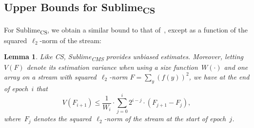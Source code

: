 \documentclass[sigconf]{acmart}
\newtheorem{lemma}[theorem]{Lemma}
\newcommand{\sketch}{Sublime}
\newcommand{\sketchcms}{\sketch\textsubscript{CMS}\xspace}
\newcommand{\sketchcs}{\sketch\textsubscript{CS}\xspace}
\begin{document}
\subsection{Upper Bounds for \sketchcs}\label{sec:upper_bounds_cs}
For \sketchcs, we obtain a similar bound to that of~, except
as a function of the squared~$\ell_2${\nobreakdash-}norm of the stream:
\begin{lemma}
    \label{lemma:cs-w} 
    Like CS, \sketchcms provides unbiased estimates. Moreover, letting~$V(F)$
    denote its estimation variance when using a size function~$W(\cdot)$ and
    one array on a stream with squared~$\ell_2${\nobreakdash-}norm $F = \sum_y
    (f(y))^2$, we have at the end of epoch~$i$ that
    $$ V(F_{i+1}) \leq \frac{1}{W_i} \cdot \sum_{j=0}^i 2^{i-j} \cdot (F_{j+1} - F_j), $$
    where~$F_j$ denotes the squared~$\ell_2${\nobreakdash-}norm of the stream
    at the start of epoch~$j$. 
\end{lemma}
\end{document}
